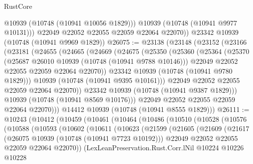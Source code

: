 \begin{lexlean}{RustCore}
\begin{coremodule}
            @10939
            (@10748 (@10941 @10056 @1829)))
          @10939
          (@10748 (@10941 @9977 @10131)))
        @22049
        @22052
        @22055
        @22059
        @22064
        @22070))
    @23342
    @10939
    (@10748 (@10941 @9969 @1829))
@26075 := @23138
    (@23148
      (@23152
        (@23166
          (@23181
            (@24655
              (@24665
                (@24669
                  (@24675
                    (@25350
                      (@25360
                        (@25364
                          (@25370
                            (@25687 @26010 @10939 (@10748 (@10941 @9788 @10146)))
                            @22049
                            @22052
                            @22055
                            @22059
                            @22064
                            @22070))
                        @23342
                        @10939
                        (@10748 (@10941 @9780 @1829)))
                      @10939
                      (@10748 (@10941 @9395 @10161)))
                    @22049
                    @22052
                    @22055
                    @22059
                    @22064
                    @22070))
                @23342
                @10939
                (@10748 (@10941 @9387 @1829)))
              @10939
              (@10748 (@10941 @8569 @10176)))
            @22049
            @22052
            @22055
            @22059
            @22064
            @22070)))
      @14412
      @10939
      (@10748 (@10941 @8555 @1829)))
@26111 := @10243
    (@10412
      (@10459
        (@10461
          (@10464
            (@10486
              (@10510
                (@10528
                  (@10576
                    (@10588
                      (@10593
                        (@10602
                          (@10611
                            (@10623
                              (@21599
                                (@21605
                                  (@21609
                                    (@21617
                                      (@26075 @10939 (@10748 (@10941 @7723 @10192)))
                                      @22049
                                      @22052
                                      @22055
                                      @22059
                                      @22064
                                      @22070))
                                  (LexLeanPreservation.Rust.Corr.lNil
                                    @10224
                                    @10226
                                    @10228

\end{coremodule}
\end{lexlean}
